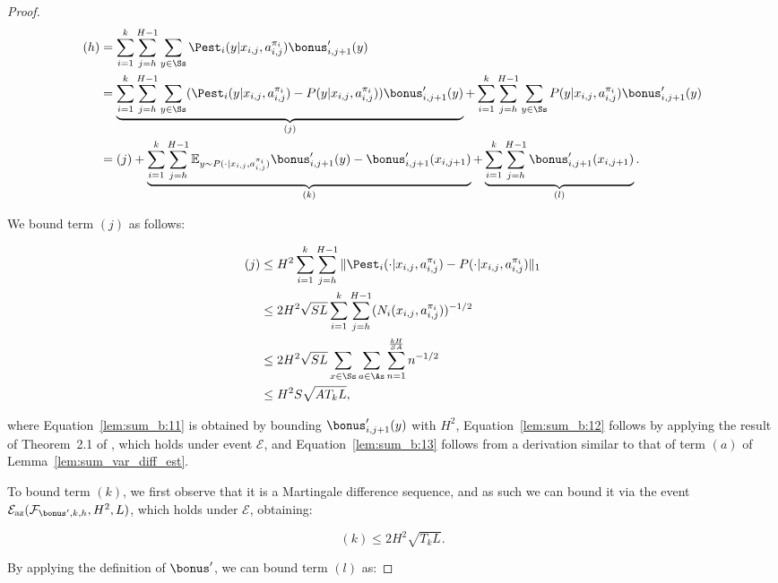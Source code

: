 \begin{proof}
\begin{align}
    (h) &= \sum_{i=1}^k \sum_{j=h}^{H-1} \sum_{y \in \Ss} \Pest_i (y | x_{i,j}, a_{i,j}^{\pi_i}) \bonus'_{i,j+1}(y) \nonumber \\
    &= \underbrace{\sum_{i=1}^k \sum_{j=h}^{H-1} \sum_{y \in \Ss} (\Pest_i (y | x_{i,j}, a_{i,j}^{\pi_i}) - P (y | x_{i,j}, a_{i,j}^{\pi_i} )) \bonus'_{i,j+1}(y)}_{(j)} + \sum_{i=1}^k \sum_{j=h}^{H-1} \sum_{y \in \Ss} P(y | x_{i,j}, a_{i,j}^{\pi_i}) \bonus'_{i,j+1}(y) \nonumber \\
    &= (j) + \underbrace{\sum_{i=1}^k \sum_{j=h}^{H-1} \mathbb{E}_{y \sim P(\cdot | x_{i,j}, a_{i,j}^{\pi_i})} \bonus'_{i,j+1}(y) - \bonus'_{i,j+1}(x_{i,j+1})}_{(k)} + \underbrace{\sum_{i=1}^k \sum_{j=h}^{H-1} \bonus'_{i,j+1}(x_{i,j+1})}_{(l)}. \label{lem:sum_b:10}
\end{align}

We bound term $(j)$ as follows:

\begin{align}
    (j) &\le H^2 \sum_{i=1}^k \sum_{j=h}^{H-1} \| \Pest_i (\cdot | x_{i,j}, a_{i,j}^{\pi_i}) - P(\cdot | x_{i,j}, a_{i,j}^{\pi_i}) \|_1 \label{lem:sum_b:11} \\
    &\le 2 H^2 \sqrt{SL} \sum_{i=1}^k \sum_{j=h}^{H-1} (N_i (x_{i,j}, a_{i,j}^{\pi_i}))^{-1/2} \label{lem:sum_b:12} \\
    &\le 2 H^2 \sqrt{SL} \sum_{x \in \Ss} \sum_{a \in \As} \sum_{n=1}^{\frac{kH}{SA}} n^{-1/2} \nonumber \\
    &\le H^2 S \sqrt{A T_k L}, \label{lem:sum_b:13}
\end{align}

where Equation~\eqref{lem:sum_b:11} is obtained by bounding $\bonus'_{i,j+1}(y)$ with $H^2$, Equation~\eqref{lem:sum_b:12} follows by applying the result of Theorem~{2.1} of \cite{weissman2003}, which holds under event $\mathcal{E}$, and Equation~\eqref{lem:sum_b:13} follows from a derivation similar to that of term $(a)$ of Lemma~\ref{lem:sum_var_diff_est}.

To bound term $(k)$, we first observe that it is a Martingale difference sequence, and as such we can bound it via the event $\mathcal{E}_{\mathrm{az}}(\mathcal{F}_{\bonus', k, h}, H^2, L)$, which holds under $\mathcal{E}$, obtaining:

\begin{equation*}
    (k) \le 2 H^2 \sqrt{T_k L}.
\end{equation*}

By applying the definition of $\bonus'$, we can bound term $(l)$ as:


\end{proof}
